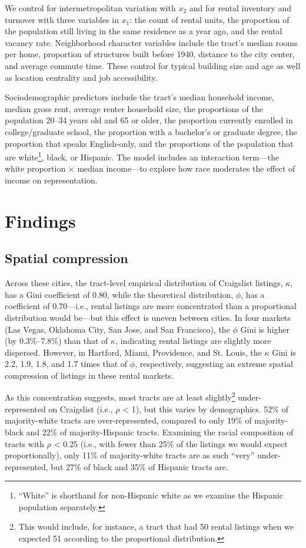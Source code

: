 \documentclass[11pt,onecolumn]{article} %
\begin{document}
We control for intermetropolitan variation with $x_2$ and for rental inventory and turnover with three variables in $x_1$: the count of rental units, the proportion of the population still living in the same residence as a year ago, and the rental vacancy rate. Neighborhood character variables include the tract's median rooms per home, proportion of structures built before 1940, distance to the city center, and average commute time. These control for typical building size and age as well as location centrality and job accessibility.

Sociodemographic predictors include the tract's median household income, median gross rent, average renter household size, the proportions of the population 20--34 years old and 65 or older, the proportion currently enrolled in college/graduate school, the proportion with a bachelor's or graduate degree, the proportion that speaks English-only, and the proportions of the population that are white\footnote{\enquote{White} is shorthand for non-Hispanic white as we examine the Hispanic population separately.}, black, or Hispanic. The model includes an interaction term---the white proportion $\times$ median income---to explore how race moderates the effect of income on representation.




\section{Findings}

\subsection{Spatial compression}

Across these cities, the tract-level empirical distribution of Craigslist listings, $\kappa$, has a Gini coefficient of 0.80, while the theoretical distribution, $\phi$, has a coefficient of 0.70---i.e., rental listings are more concentrated than a proportional distribution would be---but this effect is uneven between cities. In four markets (Las Vegas, Oklahoma City, San Jose, and San Francisco), the $\phi$ Gini is higher (by 0.3\%--7.8\%) than that of $\kappa$, indicating rental listings are slightly more dispersed. However, in Hartford, Miami, Providence, and St. Louis, the $\kappa$ Gini is 2.2, 1.9, 1.8, and 1.7 times that of $\phi$, respectively, suggesting an extreme spatial compression of listings in these rental markets.

As this concentration suggests, most tracts are at least slightly\footnote{This would include, for instance, a tract that had 50 rental listings when we expected 51 according to the proportional distribution.} under-represented on Craigslist (i.e., $\rho$ < 1), but this varies by demographics. 52\% of majority-white tracts are over-represented, compared to only 19\% of majority-black and 22\% of majority-Hispanic tracts. Examining the racial composition of tracts with $\rho$ < 0.25 (i.e., with fewer than 25\% of the listings we would expect proportionally), only 11\% of majority-white tracts are as such \enquote{very} under-represented, but 27\% of black and 35\% of Hispanic tracts are.
\end{document}
